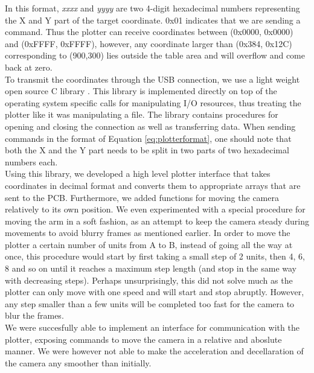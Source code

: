 In this format, \textit{xxxx} and \textit{yyyy} are two 4-digit hexadecimal numbers representing the X and Y part of the target coordinate. 0x01 indicates that we are sending a command. Thus the plotter can receive coordinates between (0x0000, 0x0000) and (0xFFFF, 0xFFFF), however, any coordinate larger than (0x384, 0x12C) corresponding to (900,300) lies outside the table area and will overflow and come back at zero. \\

To transmit the coordinates through the USB connection, we use a light weight open source C library \cite{rs232}. This library is implemented directly on top of the operating system specific calls for manipulating I/O resources, thus treating the plotter like it was manipulating a file. The library contains procedures for opening and closing the connection as well as transferring data. When sending commands in the format of Equation \ref{eq:plotterformat}, one should note that both the X and the Y part needs to be split in two parts of two hexadecimal numbers each. \\

Using this library, we developed a high level plotter interface that takes coordinates in decimal format and converts them to appropriate arrays that are sent to the PCB. Furthermore, we added functions for moving the camera relatively to its own position. We even experimented with a special procedure for moving the arm in a soft fashion, as an attempt to keep the camera steady during movements to avoid blurry frames as mentioned earlier. In order to move the plotter a certain number of units from A to B, instead of going all the way at once, this procedure would start by first taking a small step of 2 units, then 4, 6, 8 and so on until it reaches a maximum step length (and stop in the same way with decreasing steps). Perhaps unsurprisingly, this did not solve much as the plotter can only move with one speed and will start and stop abruptly. However, any step smaller than a few units will be completed too fast for the camera to blur the frames. \\

We were succesfully able to implement an interface for communication with the plotter, exposing commands to move the camera in a relative and aboslute manner. We were however not able to make the acceleration and decellaration of the camera any smoother than initially.

